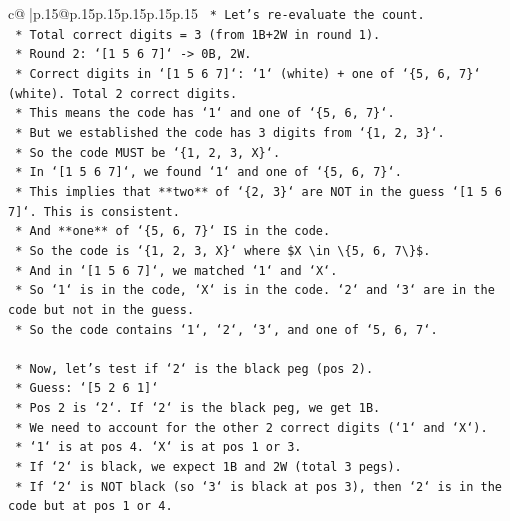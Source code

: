 \documentclass{article}
\begin{document}
{\begin{supertabular}{c@{$\;$}|p{.15\linewidth}@{}p{.15\linewidth}p{.15\linewidth}p{.15\linewidth}p{.15\linewidth}p{.15\linewidth}}
{{{\texttt{        *   Let's re{-}evaluate the count.} \\
\texttt{        *   Total correct digits = 3 (from 1B+2W in round 1).} \\
\texttt{        *   Round 2: `{[}1 5 6 7{]}` {-}> 0B, 2W.} \\
\texttt{        *   Correct digits in `{[}1 5 6 7{]}`: `1` (white) + one of `\{5, 6, 7\}` (white). Total 2 correct digits.} \\
\texttt{        *   This means the code has `1` and one of `\{5, 6, 7\}`.} \\
\texttt{        *   But we established the code has 3 digits from `\{1, 2, 3\}`.} \\
\texttt{        *   So the code MUST be `\{1, 2, 3, X\}`.} \\
\texttt{        *   In `{[}1 5 6 7{]}`, we found `1` and one of `\{5, 6, 7\}`.} \\
\texttt{        *   This implies that **two** of `\{2, 3\}` are NOT in the guess `{[}1 5 6 7{]}`. This is consistent.} \\
\texttt{        *   And **one** of `\{5, 6, 7\}` IS in the code.} \\
\texttt{        *   So the code is `\{1, 2, 3, X\}` where \$X \textbackslash{}in \textbackslash{}\{5, 6, 7\textbackslash{}\}\$.} \\
\texttt{        *   And in `{[}1 5 6 7{]}`, we matched `1` and `X`.} \\
\texttt{        *   So `1` is in the code, `X` is in the code. `2` and `3` are in the code but not in the guess.} \\
\texttt{        *   So the code contains `1`, `2`, `3`, and one of `5, 6, 7`.} \\
\\ 
\texttt{    *   Now, let's test if `2` is the black peg (pos 2).} \\
\texttt{    *   Guess: `{[}5 2 6 1{]}`} \\
\texttt{        *   Pos 2 is `2`. If `2` is the black peg, we get 1B.} \\
\texttt{        *   We need to account for the other 2 correct digits (`1` and `X`).} \\
\texttt{        *   `1` is at pos 4. `X` is at pos 1 or 3.} \\
\texttt{        *   If `2` is black, we expect 1B and 2W (total 3 pegs).} \\
\texttt{        *   If `2` is NOT black (so `3` is black at pos 3), then `2` is in the code but at pos 1 or 4.} \\
}}}
\end{supertabular}}
\end{document}
